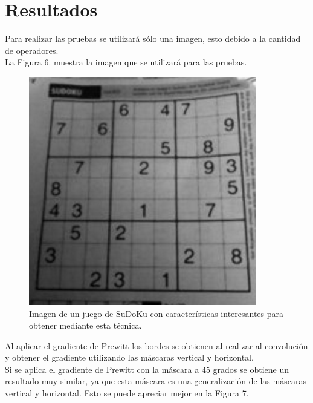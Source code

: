 \documentclass[conference]{IEEEtran}
\begin{document}
\section{Resultados}
Para realizar las pruebas se utilizar\'a s\'olo una imagen, esto debido a la cantidad de operadores.\\
La Figura 6. muestra la imagen que se utilizar\'a para las pruebas.\\

\begin{figure}[h]
	\centering
	\setlength{\unitlength}{0.00105in}
	\includegraphics[scale=0.40]{./images/sudoku.png}
	\caption{Imagen de un juego de SuDoKu con caracter\'isticas interesantes para obtener mediante esta t\'ecnica.}
\end{figure}

\newpage
Al aplicar el gradiente de Prewitt los bordes se obtienen al realizar al convoluci\'on y obtener el gradiente utilizando las m\'ascaras vertical y horizontal.\\ Si se aplica el gradiente de Prewitt con la m\'ascara a $45$ grados se obtiene un resultado muy similar, ya que esta m\'ascara es una generalizaci\'on de las m\'ascaras vertical y horizontal. Esto se puede apreciar mejor en la Figura 7.
\end{document}
